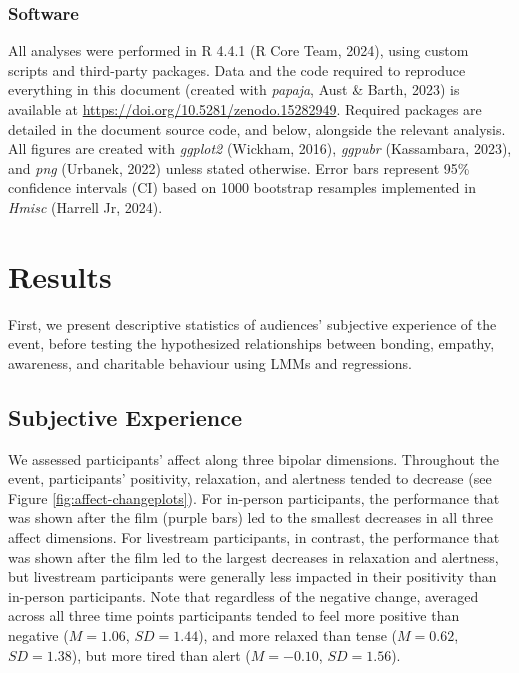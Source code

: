 \documentclass[
  man,floatsintext]{apa6}
\begin{document}
\subsubsection{Software}\label{software}

All analyses were performed in R 4.4.1 (R Core Team, 2024), using custom scripts and third-party packages. Data and the code required to reproduce everything in this document (created with \emph{papaja}, Aust \& Barth, 2023) is available at \url{https://doi.org/10.5281/zenodo.15282949}. Required packages are detailed in the document source code, and below, alongside the relevant analysis. All figures are created with \emph{ggplot2} (Wickham, 2016), \emph{ggpubr} (Kassambara, 2023), and \emph{png} (Urbanek, 2022) unless stated otherwise. Error bars represent 95\% confidence intervals (CI) based on 1000 bootstrap resamples implemented in \emph{Hmisc} (Harrell Jr, 2024).

\section{Results}\label{results}

First, we present descriptive statistics of audiences' subjective experience of the event, before testing the hypothesized relationships between bonding, empathy, awareness, and charitable behaviour using LMMs and regressions.

\subsection{Subjective Experience}\label{subjective-experience-1}

We assessed participants' affect along three bipolar dimensions. Throughout the event, participants' positivity, relaxation, and alertness tended to decrease (see Figure \ref{fig:affect-changeplots}). For in-person participants, the performance that was shown after the film (purple bars) led to the smallest decreases in all three affect dimensions. For livestream participants, in contrast, the performance that was shown after the film led to the largest decreases in relaxation and alertness, but livestream participants were generally less impacted in their positivity than in-person participants. Note that regardless of the negative change, averaged across all three time points participants tended to feel more positive than negative (\(M = 1.06\), \(SD = 1.44\)), and more relaxed than tense (\(M = 0.62\), \(SD = 1.38\)), but more tired than alert (\(M = -0.10\), \(SD = 1.56\)).
\end{document}
